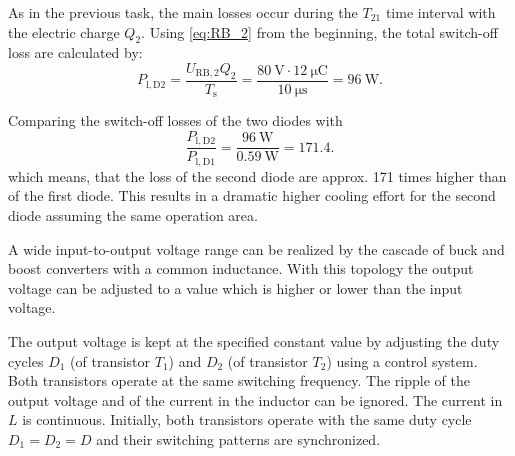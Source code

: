 \begin{solutionblock}
    As in the previous task, the main losses occur during the $T_{21}$ time interval with the electric charge $Q_{2}$. Using \eqref{eq:RB_2} from the beginning, the total switch-off loss are calculated by:
    \begin{equation}
        P_{\mathrm{l,D2}} = \frac{U_{\mathrm{RB,2}}Q_2}{T_{\mathrm{s}}}
        = \frac{\SI{80}{\volt}\cdot\SI{12}{\micro\coulomb}}{\SI{10}{\micro\second}} = \SI{96}{\watt}.
    \end{equation}

    Comparing the switch-off losses of the two diodes with
    \begin{equation}
        \frac{P_{\mathrm{l,D2}}}{P_{\mathrm{l,D1}}} = \frac{\SI{96}{\watt}}{\SI{0.59}{\watt}} = 171.4.
    \end{equation}
    which means, that the loss of the second diode are approx. 171 times higher than of the first diode. This results in a dramatic higher cooling effort for the second diode assuming the same operation area.

\end{solutionblock}




A wide input-to-output voltage range can be realized by the cascade of buck and boost converters with a common inductance.
With this topology the output voltage can be adjusted to a value which is higher or lower than the input voltage.
\par

\par


The output voltage is kept at the specified constant value by adjusting the duty cycles $D_1$ 
(of transistor  $T_1$) and $D_2$ (of transistor $T_2$) using a control system. Both transistors operate at the same switching frequency.
The ripple of the output voltage and of the current in the inductor can be ignored. The current in $L$ is continuous.
Initially, both transistors operate with the same duty cycle $D_1 = D_2 = D$ and their switching patterns are synchronized.



